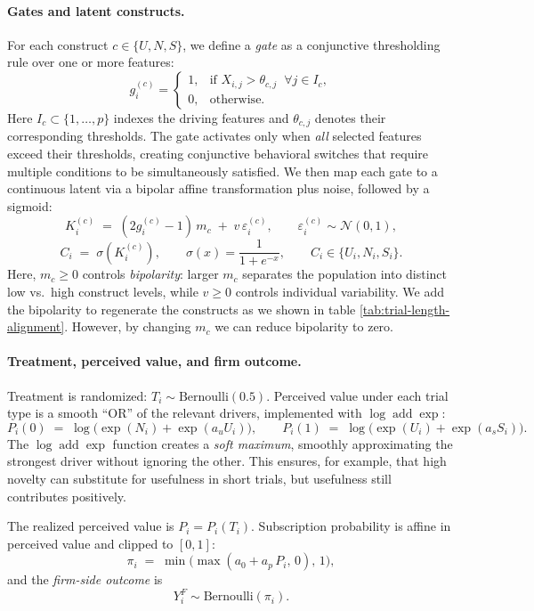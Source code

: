 \documentclass[11pt,letterpaper,english]{article}
\theoremstyle{definition}
\theoremstyle{definition}
\begin{document}
\begin{bibunit}
\paragraph{Gates and latent constructs.}
For each construct $c \in \{U, N, S\}$, we define a \emph{gate} as a conjunctive thresholding rule over one or more features:
\[
g_i^{(c)} = 
\begin{cases}
1, & \text{if } X_{i,j} > \theta_{c,j} \;\;\forall j \in I_c, \\
0, & \text{otherwise}.
\end{cases}
\]
Here $I_c \subset \{1,\dots,p\}$ indexes the driving features and $\theta_{c,j}$ denotes their corresponding thresholds.  
The gate activates only when \emph{all} selected features exceed their thresholds, creating conjunctive behavioral switches that require multiple conditions to be simultaneously satisfied.
We then map each gate to a continuous latent via a bipolar affine transformation plus noise, followed by a sigmoid:
\[
K_i^{(c)} \;=\; (2g_i^{(c)}-1)\, m_c \;+\; v\,\varepsilon_i^{(c)}, 
\qquad
\varepsilon_i^{(c)}\sim \mathcal{N}(0,1),
\]
\[
C_i \;=\; \sigma\!\left(K_i^{(c)}\right), 
\qquad \sigma(x)=\frac{1}{1+e^{-x}}, 
\qquad C_i\in\{U_i,N_i,S_i\}.
\]
Here, $m_c\ge 0$ controls \emph{bipolarity}: larger $m_c$ separates the population into distinct low vs.\ high construct levels, while $v\ge 0$ controls individual variability. We add the bipolarity to regenerate the constructs as we shown in table \ref{tab:trial-length-alignment}. However, by changing $m_c$ we can reduce bipolarity to zero.

\paragraph{Treatment, perceived value, and firm outcome.}
Treatment is randomized: $T_i\sim\mathrm{Bernoulli}(0.5)$. Perceived value under each trial type is a smooth ``OR'' of the relevant drivers, implemented with $\log\!\operatorname{add}\exp$:
\[
P_i(0) \;=\; \log\!\big(\exp(N_i) + \exp(a_u U_i)\big),
\qquad
P_i(1) \;=\; \log\!\big(\exp(U_i) + \exp(a_s S_i)\big).
\]
The $\log\!\operatorname{add}\exp$ function creates a \emph{soft maximum}, smoothly approximating the strongest driver without ignoring the other. This ensures, for example, that high novelty can substitute for usefulness in short trials, but usefulness still contributes positively.  

The realized perceived value is $P_i = P_i(T_i)$. Subscription probability is affine in perceived value and clipped to $[0,1]$:
\[
\pi_i \;=\; \min\big(\max(a_0 + a_p\, P_i,\, 0),\, 1\big),
\]
and the \emph{firm-side outcome} is
\[
Y_i^F \sim \mathrm{Bernoulli}(\pi_i).
\]


\end{bibunit}
\end{document}
